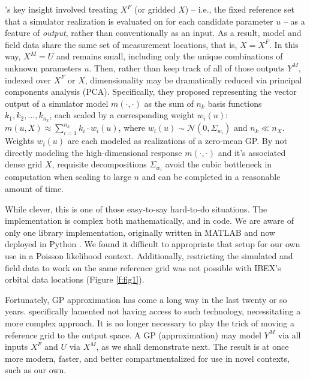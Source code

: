 \documentclass[11pt]{article}
\begin{document}
\citeauthor{higdoncalib2008}'s key insight involved treating $X^F$ (or gridded
$X$) -- i.e., the fixed reference set that a simulator realization is
evaluated on for each candidate parameter $u$ -- as a feature of {\em output},
rather than conventionally as an input. As a result, model and field data
share the same set of measurement locations, that is, $X = X^F$. In this way,
$X^M=U$ and remains small, including only the unique combinations of unknown
parameters $u$. Then, rather than keep track of all of those outputs $Y^M$,
indexed over $X^F$ or $X$, dimensionality may be dramatically reduced via
principal components analysis (PCA). Specifically, they proposed representing
the vector output of a simulator model $m(\cdot,\cdot)$ as the sum of $n_k$
basis functions $k_1, k_2,\ldots , k_{n_k}$, each scaled by a corresponding
weight $w_i(u)$: $m(u, X) \approx \sum_{i=1}^{n_k}  k_i \cdot w_i (u)$, where
$w_i(u) \sim \mathcal{N}( 0,
\Sigma_{w_i})$ and $n_k \ll n_X$. Weights $w_i(u)$ are each modeled as
realizations of a zero-mean GP. By not directly modeling the high-dimensional
response $m(\cdot,\cdot)$ and it's associated dense grid $X$, requisite
decompositions $\Sigma_{w_i}$ avoid the cubic bottleneck in computation when
scaling to large $n$ and can be completed in a reasonable amount of time.

While clever, this is one of those easy-to-say hard-to-do situations. The
implementation is complex both mathematically, and in code.  We are aware of
only one library implementation, originally written in {\sf MATLAB} and now
deployed in {\sf Python} \citep{gattiker2020lanl}.  We found it difficult to
appropriate that setup for our own use in a Poisson likelihood context.
Additionally, restricting the simulated and field data to work on the same
reference grid was not possible with IBEX's orbital data locations (Figure
\ref{f:fig1}).

Fortunately, GP approximation has come a long way in the last
twenty or so years. \citeauthor{higdoncalib2008} specifically lamented not having
access to such technology, necessitating a more complex approach. It is no
longer necessary to play the trick of moving a reference grid to the output
space.  A GP (approximation) may model $Y^M$ via all inputs $X^F$ and $U$ via
$X^M$, as we shall demonstrate next.  The result is at once more modern, faster,
and better compartmentalized for use in novel contexts, such as our own.

\end{document}
